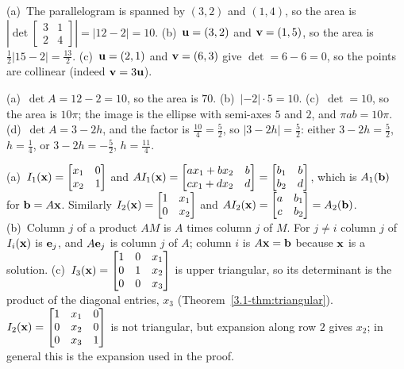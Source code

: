 \documentclass[11pt]{article}
\begin{document}
\begin{description}[leftmargin=0pt,itemsep=5pt]
  \item[Knowledge Check \ref{kc:area}.] (a)~The parallelogram is spanned by $(3,2)$ and $(1,4)$, so the area is $\left|\det\begin{bmatrix}3&1\\2&4\end{bmatrix}\right|=|12-2|=10$. (b)~$\mathbf{u}=(3,2)$ and $\mathbf{v}=(1,5)$, so the area is $\tfrac12|15-2|=\tfrac{13}2$. (c)~$\mathbf{u}=(2,1)$ and $\mathbf{v}=(6,3)$ give $\det=6-6=0$, so the points are collinear (indeed $\mathbf{v}=3\mathbf{u}$).
  \item[Knowledge Check \ref{kc:scale}.] (a)~$\det A=12-2=10$, so the area is $70$. (b)~$|{-2}|\cdot5=10$. (c)~$\det=10$, so the area is $10\pi$; the image is the ellipse with semi-axes $5$ and $2$, and $\pi ab=10\pi$. (d)~$\det A=3-2h$, and the factor is $\frac{10}4=\frac52$, so $|3-2h|=\frac52$: either $3-2h=\frac52$, $h=\frac14$, or $3-2h=-\frac52$, $h=\frac{11}4$.
  \item[Pause and think \ref{think:why}.] (a)~$I_1(\mathbf{x})=\begin{bmatrix}x_1&0\\x_2&1\end{bmatrix}$ and $AI_1(\mathbf{x})=\begin{bmatrix}ax_1+bx_2&b\\cx_1+dx_2&d\end{bmatrix}=\begin{bmatrix}b_1&b\\b_2&d\end{bmatrix}$, which is $A_1(\mathbf{b})$ for $\mathbf{b}=A\mathbf{x}$. Similarly $I_2(\mathbf{x})=\begin{bmatrix}1&x_1\\0&x_2\end{bmatrix}$ and $AI_2(\mathbf{x})=\begin{bmatrix}a&b_1\\c&b_2\end{bmatrix}=A_2(\mathbf{b})$. (b)~Column $j$ of a product $AM$ is $A$ times column $j$ of $M$. For $j\neq i$ column $j$ of $I_i(\mathbf{x})$ is $\mathbf{e}_j$, and $A\mathbf{e}_j$ is column $j$ of $A$; column $i$ is $A\mathbf{x}=\mathbf{b}$ because $\mathbf{x}$ is a solution. (c)~$I_3(\mathbf{x})=\begin{bmatrix}1&0&x_1\\0&1&x_2\\0&0&x_3\end{bmatrix}$ is upper triangular, so its determinant is the product of the diagonal entries, $x_3$ (Theorem~\ref{3.1-thm:triangular}). $I_2(\mathbf{x})=\begin{bmatrix}1&x_1&0\\0&x_2&0\\0&x_3&1\end{bmatrix}$ is not triangular, but expansion along row $2$ gives $x_2$; in general this is the expansion used in the proof.

\end{description}
\end{document}
